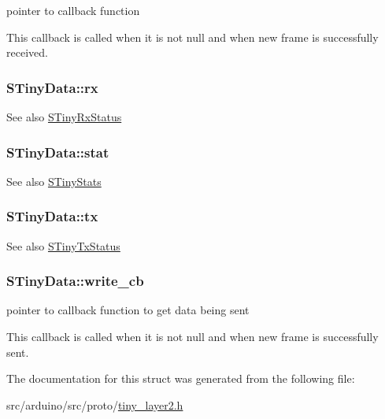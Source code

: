 pointer to callback function 

This callback is called when it is not null and when new frame is successfully received. \hypertarget{structSTinyData_aa3b43db99a1a6bf3d562f932d5a539db}{}
\subsubsection[{rx}]{ S\+Tiny\+Data\+::rx}\label{structSTinyData_aa3b43db99a1a6bf3d562f932d5a539db}
\begin{DoxySeeAlso}{See also}
\hyperlink{structSTinyRxStatus}{S\+Tiny\+Rx\+Status} 
\end{DoxySeeAlso}
\hypertarget{structSTinyData_a16ba8c9e60d6aee3fcd4909f85561f3d}{}
\subsubsection[{stat}]{ S\+Tiny\+Data\+::stat}\label{structSTinyData_a16ba8c9e60d6aee3fcd4909f85561f3d}
\begin{DoxySeeAlso}{See also}
\hyperlink{structSTinyStats}{S\+Tiny\+Stats} 
\end{DoxySeeAlso}
\hypertarget{structSTinyData_aa099adb35f3494332747eb18851fbb23}{}
\subsubsection[{tx}]{ S\+Tiny\+Data\+::tx}\label{structSTinyData_aa099adb35f3494332747eb18851fbb23}
\begin{DoxySeeAlso}{See also}
\hyperlink{structSTinyTxStatus}{S\+Tiny\+Tx\+Status} 
\end{DoxySeeAlso}
\hypertarget{structSTinyData_ada334c88e86bfd2c10191f65818c3fb3}{}
\subsubsection[{write\+\_\+cb}]{ S\+Tiny\+Data\+::write\+\_\+cb}\label{structSTinyData_ada334c88e86bfd2c10191f65818c3fb3}


pointer to callback function to get data being sent 

This callback is called when it is not null and when new frame is successfully sent. 

The documentation for this struct was generated from the following file\+:\begin{DoxyCompactItemize}
\item 
src/arduino/src/proto/\hyperlink{src_2arduino_2src_2proto_2tiny__layer2_8h}{tiny\+\_\+layer2.\+h}\end{DoxyCompactItemize}
